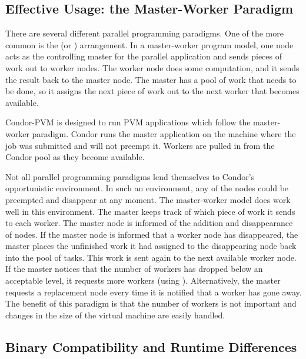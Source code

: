 \subsection{Effective Usage: the Master-Worker Paradigm}

There are several different parallel programming paradigms.  One of the
more common is the  (or )
arrangement.  In a master-worker program model, one node acts as the
controlling master for the parallel application and sends pieces
of work out to worker nodes.
The worker node does some computation, and it sends the result back to the
master node.  The master has a pool of work that needs to be
done, so it assigns the next piece of work out to the next worker
that becomes available.  

Condor-PVM is designed to run PVM applications which follow the
master-worker paradigm.  Condor runs the master application on the
machine where the job was submitted and will not preempt it.  Workers
are pulled in from the Condor pool as they become available.

Not all parallel programming paradigms lend themselves to Condor's
opportunistic environment. In such an environment, any of the nodes
could be preempted and disappear at any moment.
The master-worker model does work well in this environment.
The master keeps track of which piece of work it
sends to each worker. The master node is informed of
the addition and disappearance of nodes.
If the master node is informed that a worker node
has disappeared, the master places the unfinished work it had assigned
to the disappearing node
back into the pool of tasks.
This work is sent again to the next
available worker node.
If the master notices that the number of workers has
dropped below an acceptable level, it requests more workers
(using ).
Alternatively, the master requests
a replacement node every time it is notified that a worker has
gone away. The benefit of this paradigm is that the number of workers is
not important and changes in the size of
the virtual machine are easily handled.

\subsection{Binary Compatibility and Runtime Differences}

